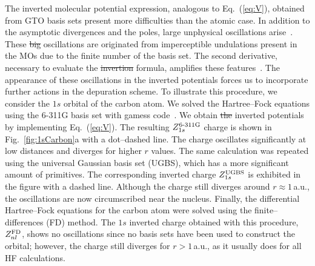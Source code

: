 \documentclass[10pt]{article}
\providecommand{\DIFaddtex}[1]{{\protect\color{blue}\uwave{#1}}} %
\providecommand{\DIFdeltex}[1]{{\protect\color{red}\sout{#1}}}                      %
\providecommand{\DIFaddbegin}{} %
\providecommand{\DIFaddend}{} %
\providecommand{\DIFdelbegin}{} %
\providecommand{\DIFdelend}{} %
\providecommand{\DIFadd}[1]{\texorpdfstring{\DIFaddtex{#1}}{#1}} %
\providecommand{\DIFdel}[1]{\texorpdfstring{\DIFdeltex{#1}}{}} %
\begin{document}
The inverted molecular potential expression, analogous 
to Eq.~(\ref{eq:V}), obtained from GTO basis sets present more difficulties
than the atomic case. In addition to the asymptotic divergences and
the poles, large unphysical 
oscillations arise~\cite{Schipper1997,Mura1997,Jacob2011,Gaiduk2013}. 
These \DIFdelbegin \DIFdel{big }\DIFdelend \DIFaddbegin \DIFadd{prominent }\DIFaddend oscillations are originated from imperceptible undulations 
present in the MOs due to the finite number of the basis set. The
second derivative, necessary to evaluate the \DIFdelbegin \DIFdel{invertion }\DIFdelend \DIFaddbegin \DIFadd{inversion }\DIFaddend formula, amplifies
these features~\cite{Schipper1997,Gaiduk2013}.
The appearance of these oscillations in the inverted potentials forces us to
incorporate further actions in the depuration scheme. To illustrate 
this procedure, we consider the $1s$ orbital of the carbon atom. 
We solved the Hartree--Fock equations using the \mbox{6-311G} basis set 
with {\sc gamess} code~\cite{Schmidt1993,Gordon2005}.
We obtain \DIFdelbegin \DIFdel{the }\DIFdelend inverted potentials by implementing Eq.~(\ref{eq:V}). 
The resulting $Z_{1s}^{\mbox{\scriptsize 6-311G}}$ charge is shown in 
Fig.~\ref{fig:1sCarbon}a with a dot--dashed line. 
The charge oscillates significantly at low distances and diverges for 
higher $r$ values. The same calculation was 
repeated using the universal Gaussian basis set (UGBS), which has a 
more significant amount of primitives. The corresponding inverted 
charge $Z_{1s}^{\mbox{\scriptsize UGBS}}$ is exhibited in the figure 
with a dashed line. 
Although the charge still diverges around $r\approx1\,$a.u., the 
oscillations are now circumscribed near the nucleus.
Finally, the differential Hartree--Fock equations for the carbon 
atom were solved using the finite--differences (FD) method. 
The $1s$ inverted charge obtained with this procedure, 
$Z_{nl}^{\mbox{\scriptsize FD}}$, shows no oscillations since no basis 
sets have 
been used to construct the orbital; however, the charge still 
diverges for $r>1\,$a.u., as it usually does for all HF calculations.
\end{document}
